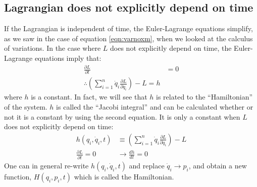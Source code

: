 \subsection{Lagrangian does not explicitly depend on time}
If the Lagrangian is independent of time, the Euler-Lagrange equations simplify, as we saw in the case of equation \ref{eqn:varnoxm}, when we looked at the calculus of variations. In the case where $L$ does not explicitly depend on time, the Euler-Lagrange equations imply that:
\begin{align}
\frac{\partial L}{\partial t} &=0\nonumber\\
\therefore \left(\sum_{i=1}^n \dot{q}_i\frac{\partial L}{\partial \dot{q}_i}\right) -L =h
\label{eqn:varnot}
\end{align}
where $h$ is a constant. In fact, we will see that $h$ is related to the ``Hamiltonian'' of the system. $h$ is called the ``Jacobi integral'' and can be calculated whether or not it is a constant by using the second equation. It is only a constant when $L$ does not explicitly depend on time:
\begin{align}
h(q_i, \dot{q}_i, t)&\equiv \left(\sum_{i=1}^n \dot{q}_i\frac{\partial L}{\partial \dot{q}_i}\right) -L\nonumber\\
\frac{\partial L}{\partial t} =0 &\to \frac{dh}{dt}=0
\end{align}
One can in general re-write $h(q_i, \dot{q}_i, t)$ and replace $\dot{q}_i\to p_i$, and obtain a new function, $H(q_i,p_i,t)$ which is called the Hamiltonian.

